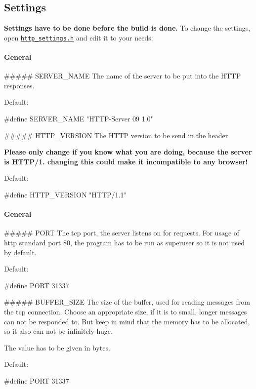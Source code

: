 \subsection*{Settings}

{\bfseries Settings have to be done before the build is done.} To change the settings, open \href{include/http_settings.h}{\tt http\+\_\+settings.\+h} and edit it to your needs\+:

\paragraph*{General}


\begin{DoxyItemize}
\item \#\#\#\#\# S\+E\+R\+V\+E\+R\+\_\+\+N\+A\+ME The name of the server to be put into the H\+T\+TP responses.

Default\+: \begin{DoxyVerb}#define SERVER_NAME "HTTP-Server 09 1.0"
\end{DoxyVerb}

\item \#\#\#\#\# H\+T\+T\+P\+\_\+\+V\+E\+R\+S\+I\+ON The H\+T\+TP version to be send in the header.

{\bfseries Please only change if you know what you are doing, because the server is H\+T\+T\+P/1. changing this could make it incompatible to any browser!}

Default\+: \begin{DoxyVerb}#define HTTP_VERSION "HTTP/1.1"
\end{DoxyVerb}

\end{DoxyItemize}

\paragraph*{General}


\begin{DoxyItemize}
\item \#\#\#\#\# P\+O\+RT The tcp port, the server listens on for requests. For usage of http standard port 80, the program has to be run as superuser so it is not used by default.

Default\+: \begin{DoxyVerb}#define PORT 31337
\end{DoxyVerb}

\item \#\#\#\#\# B\+U\+F\+F\+E\+R\+\_\+\+S\+I\+ZE The size of the buffer, used for reading messages from the tcp connection. Choose an appropriate size, if it is to small, longer messages can not be responded to. But keep in mind that the memory has to be allocated, so it also can not be infinitely huge.

The value has to be given in bytes.

Default\+: \begin{DoxyVerb}#define PORT 31337
\end{DoxyVerb}

\end{DoxyItemize}

